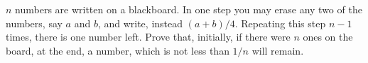 $n$ numbers are written on a blackboard. In one step you may erase any two of the numbers, say $a$ and $b$, and write, instead $(a + b)/4$. Repeating this step $n - 1$ times, there is one number left. Prove that, initially, if there were $n$ ones on the board, at the end, a number, which is not less than $1/n$ will remain.
